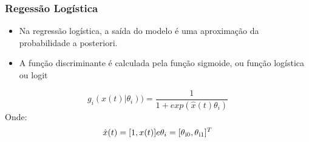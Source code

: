 \documentclass{beamer}
\begin{document}
\begin{frame}
\frametitle{Regessão Logística}
\begin{itemize} 
\item Na regressão logística, a saída do modelo é uma aproximação da
probabilidade a posteriori.
\item A função discriminante é calculada pela função sigmoide, ou função logística ou logit
\end{itemize}

\begin{theorem}
\[g_i(x(t)|\theta_i))  = \frac{1}{1+ exp(\hat{x}(t)\theta_i)}\]
Onde:
\[\hat{x}(t) = [1,x(t)] e \theta_i=[\theta\textsubscript{i0},\theta\textsubscript{i1}]^T\]

\end{theorem}

\end{frame}
\end{document}
